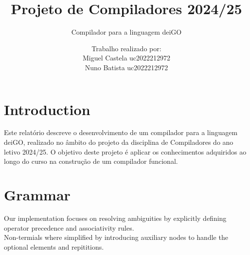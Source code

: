 \documentclass[12pt]{article}
\title{Projeto de Compiladores 2024/25}
\subtitle{Compilador para a linguagem deiGO}
\author{Trabalho realizado por:\\
Miguel Castela uc2022212972 \\
Nuno Batista uc2022212972}
\date{}
\begin{document}
\maketitle

\newpage

\section{Introduction}
Este relatório descreve o desenvolvimento de um compilador para a linguagem deiGO, realizado no âmbito do projeto da disciplina de Compiladores do ano letivo 2024/25. O objetivo deste projeto é aplicar os conhecimentos adquiridos ao longo do curso na construção de um compilador funcional.

\section{Grammar}
Our implementation focuses on resolving ambiguities by explicitly defining operator precedence and associativity rules.\\ Non-termials where simplified by introducing auxiliary nodes to handle the optional elements and repititions.
\end{document}
